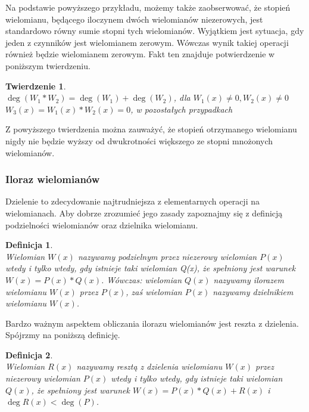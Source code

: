 \documentclass[oneside,a4paper]{book}
\newtheorem{theorem}{Twierdzenie}
\newtheorem{definition}{Definicja}
\begin{document}
	Na podstawie powyższego przykładu, możemy także zaobserwować, że stopień wielomianu, będącego iloczynem dwóch wielomianów niezerowych, jest standardowo równy sumie stopni tych wielomianów. Wyjątkiem jest sytuacja, gdy jeden z czynników jest wielomianem zerowym. Wówczas wynik takiej operacji również będzie wielomianem zerowym. Fakt ten znajduje potwierdzenie w poniższym twierdzeniu.
	
	\begin{theorem}
		$ $\\
		$\deg(W_1 * W_2) = \deg(W_1) + \deg(W_2)$, dla $W_1(x) \neq 0, W_2(x) \neq 0$\\
		$W_3(x) = W_1(x) * W_2(x) = 0$, w pozostałych przypadkach
	\end{theorem}
	
	Z powyższego twierdzenia można zauważyć, że stopień otrzymanego wielomianu nigdy nie będzie wyższy od dwukrotności większego ze stopni mnożonych wielomianów.
	
	\subsubsection{Iloraz wielomianów}
	
	Dzielenie to zdecydowanie najtrudniejsza z elementarnych operacji na wielomianach. Aby dobrze zrozumieć jego zasady zapoznajmy się z definicją podzielności wielomianów oraz dzielnika wielomianu.
	
	\begin{definition}
		$ $\\
		Wielomian $W(x)$ nazywamy podzielnym przez niezerowy wielomian $P(x)$ wtedy i tylko wtedy, gdy istnieje taki wielomian Q(x), że spełniony jest warunek $W(x) = P(x) * Q(x)$. Wówczas: wielomian $Q(x)$ nazywamy ilorazem wielomianu $W(x)$ przez $P(x)$, zaś wielomian $P(x)$ nazywamy dzielnikiem wielomianu $W(x)$.
	\end{definition}
	
	Bardzo ważnym aspektem obliczania ilorazu wielomianów jest reszta z dzielenia. Spójrzmy na poniższą definicję.
	
	\begin{definition}
		$ $\\
		Wielomian $R(x)$ nazywamy resztą z dzielenia wielomianu $W(x)$ przez niezerowy wielomian $P(x)$ wtedy i tylko wtedy, gdy istnieje taki wielomian $Q(x)$, że spełniony jest warunek $W(x) = P(x) * Q(x) + R(x)$ i $\deg R(x) < \deg(P)$.
	\end{definition}
	
\end{document}
